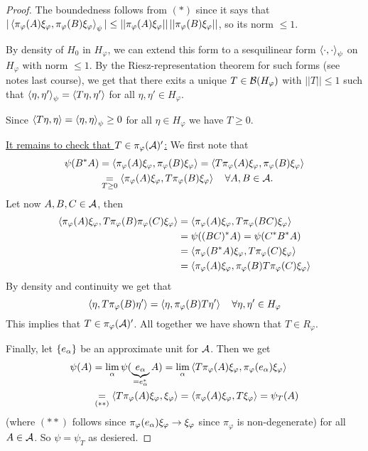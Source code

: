 \documentclass[10pt,english,a4paper]{article}
\theoremstyle{definition}
\def\pivp{\pi_{\vphi}}
\def\Hvp{H_{\vphi}}
\def\xivp{\xi_{\vphi}}
\def\vphi{\varphi}
\begin{document}
\begin{proof}
The boundedness follows from $(*)$ since it says that 
$|\ind{\pivp(A)\xivp, \pivp(B)\xivp}_{\psi}|\leq ||\pivp(A)\xivp||\, ||\pivp(B)\xivp||$,
so its norm $\leq 1$.

By density of $H_0$ in $\Hvp$, we can extend this form to a sesquilinear form 
$\left\langle \cdot,\cdot \right\rangle_{\psi}$ on $\Hvp$ with norm $\leq 1$. 
By the Riesz-representation theorem for such forms (see notes last course),
we get that there exits a unique $T\in \Bs(H_{\vphi})$ with $||T||\leq 1$ 
such that $\left\langle \eta,\eta' \right\rangle_{\psi} = \left\langle T\eta,\eta' \right\rangle$ for all $\eta,\eta' \in
\Hvp$.

Since $\left\langle T\eta,\eta \right\rangle= \left\langle \eta,\eta \right\rangle_{\psi} \geq 0$ for all $\eta \in \Hvp$
we have $T\geq 0$.

\ul{It remains to check that $T \in \pivp(\As)'$:}
We first note that 
\begin{align*}
\psi(B^*A) & = \ind{\pivp(A)\xivp, \pivp(B)\xivp} = 
\ind{T\pivp(A)\xivp, \pivp(B)\xivp} \\
&\underset{T\geq 0}{=} \ind{\pivp(A)\xivp, T\pivp(B)\xivp}\quad \forall A,B\in \As.
\end{align*}
Let now $A,B,C \in \mathcal{A}$,
then 
\begin{align*}
    \ind{\pivp(A)\xivp, T\pivp(B)\pivp(C)\xivp} &= \ind{\pivp(A)\xivp, T\pivp(BC)\xivp}\\
&= \psi((BC)^*A) = \psi(C^*B^*A) \\
&= \ind{\pivp(B^*A)\xivp, T\pivp(C)\xivp}\\ 
&= \ind{\pivp(A)\xivp, \pivp(B)T\pivp(C)\xivp} 
\end{align*}
By density and continuity we get that 
\[ \ind{\eta, T\pivp(B)\eta'} = \ind{\eta,\pivp(B)T\eta'}\quad\forall \eta,\eta' \in \Hvp \]
This implies that $T \in \pivp(\As)'$.
All together we have shown that $T \in R_{\vphi}$.

Finally, let $\{e_{\alpha}\}$ be an approximate unit for $\mathcal{A}$. 
Then we get 
\begin{align*}
\psi(A) &= \lim_{\al} \psi(\ub{e_{\al}}_{=e_{\al}^{*}}A)
= \lim_{\al}\ind{T\pivp(A)\xivp, \pivp(e_{\al})\xivp} \\
&\underset{(**)}{=}
\ind{T\pivp(A)\xivp, \xivp} = \ind{\pivp(A)\xivp, T\xivp} = \psi_{T}(A)
\end{align*}
(where $(**)$ follows since $\pivp(e_{\al})\xivp \to \xivp$ since $\pivp$ is non-degenerate)
for all $A\in \mathcal{A}$. So $\psi=\psi_T$ as desiered.  

\end{proof}
\end{document}
